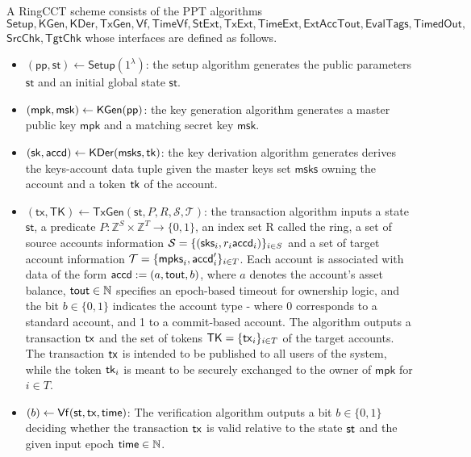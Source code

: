 	\begin{definition}
    A RingCCT scheme consists of the PPT algorithms $\mathsf{Setup},\mathsf{KGen},\mathsf{KDer}, \mathsf{TxGen},\mathsf{Vf},\mathsf{TimeVf}, \mathsf{StExt},\mathsf{TxExt}, \mathsf{TimeExt}, \mathsf{ExtAccTout}, \mathsf{EvalTags}, \mathsf{TimedOut},$ $\mathsf{SrcChk}, \mathsf{TgtChk}$
    whose interfaces are defined as follows.
    \begin{itemize}
        \item $(\mathsf{pp,st}) \gets \mathsf{Setup}(1^\lambda)$: the setup algorithm generates the public parameters $\mathsf{st}$ and an initial global state $\mathsf{st}$.
        \item $(\mathsf{mpk},\mathsf{msk}) \gets \mathsf{KGen}(\mathsf{pp})$: the key generation algorithm generates a master public key $\mathsf{mpk}$ and a matching secret key $\mathsf{msk}$.
        \item $(\mathsf{sk},\mathsf{accd}) \gets \mathsf{KDer}(\mathsf{msks, \mathsf{tk}})$: the key derivation algorithm generates derives the keys-account data tuple given the master keys set $\mathsf{msks}$ owning the account and a token $\mathsf{tk}$ of the account.
	\item $(\mathsf{tx,TK}) \gets \mathsf{TxGen}(\mathsf{st},P,R,\mathcal{S},\mathcal{T})$: the transaction algorithm inputs a state $\mathsf{st}$, a predicate $P: \mathbb{Z}^S \times \mathbb{Z}^T \rightarrow \{0,1\}$, an index set R called the ring, a set of source accounts information $\mathcal{S} = \{(\mathsf{sks}_i, r_i \mathsf{accd}_i)\}_{i\in S}$ and a set of target account information $\mathcal{T} = \{\mathsf{mpks}_i, \mathsf{accd}'_i\}_{i\in T}$. Each account is associated with data of the form $\mathsf{accd} := (a, \mathsf{tout}, b)$, where $a$ denotes the account's asset balance, $\mathsf{tout} \in \mathbb{N}$ specifies an epoch-based timeout for ownership logic, and the bit $b \in \{ 0, 1 \}$ indicates the account type - where 0 corresponds to a standard account, and 1 to a commit-based account. The algorithm outputs a transaction $\mathsf{tx}$ and the set of tokens $\mathsf{TK} = \{ \mathsf{tx}_i \}_{i \in T}$ of the target accounts. The transaction $\mathsf{tx}$ is intended to be published to all users of the system, while the token $\mathsf{tk}_i$ is meant to be securely exchanged to the owner of $\mathsf{mpk}$ for $i \in T$.
        \item $(b) \gets \mathsf{Vf}(\st,\tx, \time)$: The verification algorithm outputs a bit $b \in \{ 0, 1 \}$ deciding whether the transaction $\mathsf{tx}$ is valid relative to the state $\st$ and the given input epoch $\mathsf{time} \in \mathbb{N}$.

\end{itemize}
\end{definition}
